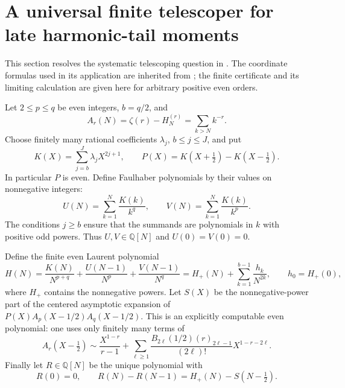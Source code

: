 \section{A universal finite telescoper for late harmonic-tail moments}
\label{tel:section}

This section resolves the systematic telescoping question in \cite{DPL}.
The coordinate formulas used in its application are inherited from
\cite{DPL,BTD}; the finite certificate and its limiting calculation
are given here for arbitrary positive even orders.

Let $2\le p\le q$ be even integers, $b=q/2$, and
\[
 A_r(N)=\zeta(r)-H_N^{(r)}=\sum_{k>N}k^{-r}.
\]
Choose finitely many rational coefficients $\lambda_j$, $b\le j\le J$,
and put
\[
 K(X)=\sum_{j=b}^J\lambda_jX^{2j+1},\qquad
 P(X)=K(X+\tfrac12)-K(X-\tfrac12).
\]
In particular $P$ is even. Define Faulhaber polynomials by their values
on nonnegative integers:
\[
 U(N)=\sum_{k=1}^N\frac{K(k)}{k^q},\qquad
 V(N)=\sum_{k=1}^N\frac{K(k)}{k^p}.
\]
The conditions $j\ge b$ ensure that the summands are polynomials in
$k$ with positive odd powers. Thus $U,V\in\mathbb Q[N]$ and
$U(0)=V(0)=0$.

Define the finite even Laurent polynomial
\begin{equation}\label{tel:H}
 H(N)=\frac{K(N)}{N^{p+q}}+
       \frac{U(N-1)}{N^p}+\frac{V(N-1)}{N^q}
      =H_+(N)+\sum_{k=1}^{b-1}\frac{h_k}{N^{2k}},
 \qquad h_0=H_+(0),
\end{equation}
where $H_+$ contains the nonnegative powers.
Let $S(X)$ be the nonnegative-power part of the centered asymptotic
expansion of $P(X)A_p(X-1/2)A_q(X-1/2)$.
This is an explicitly computable even polynomial: one uses only finitely
many terms of
\begin{equation}\label{tel:centered}
 A_r(X-\tfrac12)\sim\frac{X^{1-r}}{r-1}
 +\sum_{\ell\ge1}\frac{B_{2\ell}(1/2)(r)_{2\ell-1}}{(2\ell)!}
      X^{1-r-2\ell}.
\end{equation}
Finally let $R\in\mathbb Q[N]$ be the unique polynomial with
\[
 R(0)=0,\qquad R(N)-R(N-1)=H_+(N)-S(N-\tfrac12).
\]

